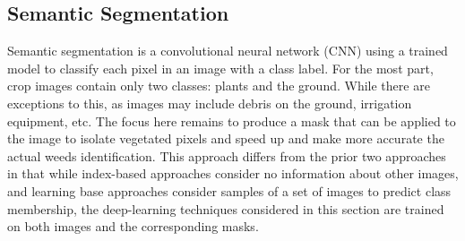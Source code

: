 \documentclass[letterpaper, notitlepage]{report}
\begin{document}
{%
%

\subsection{Semantic Segmentation}
Semantic segmentation is a convolutional neural network (\gls{CNN}) using a trained model to classify each pixel in an image with a class label.  For the most part, crop images contain only two classes: plants and the ground. While there are exceptions to this,  as images may include debris on the ground, irrigation equipment, etc.  The focus here remains to produce a mask that can be applied to the image to isolate vegetated pixels and speed up and make more accurate the actual weeds identification. This approach differs from the prior two approaches in that while index-based approaches consider no information about other images, and learning base approaches consider samples of a set of images to predict class membership, the deep-learning techniques considered in this section are trained on both images and the corresponding masks.

}
\end{document}
